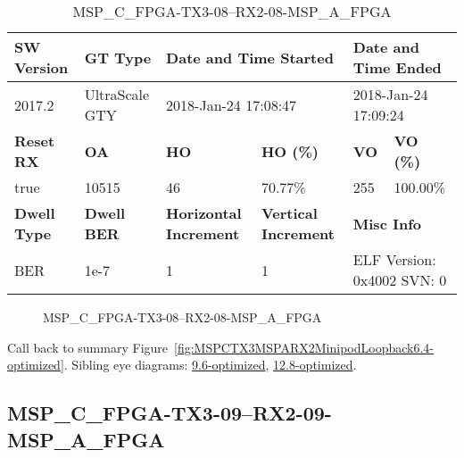 \begin{table}[h]
\centering
\caption{MSP\_C\_FPGA-TX3-08--RX2-08-MSP\_A\_FPGA}
\label{tab:MSPCFPGATX308RX208MSPAFPGA6.4-optimized}
\begin{tabular}{@{}|l|l|l|l|l|l|@{}}
\toprule
\textbf{SW Version}                & \textbf{GT Type}   & \multicolumn{2}{l|}{\textbf{Date and Time Started}}            & \multicolumn{2}{l|}{\textbf{Date and Time Ended}}        \\ \midrule
2017.2                       & UltraScale GTY          & \multicolumn{2}{l|}{2018-Jan-24 17:08:47}                   & \multicolumn{2}{l|}{2018-Jan-24 17:09:24}               \\ \midrule
\textbf{Reset RX}                  & \textbf{OA} & \textbf{HO}   & \textbf{HO (\%)} & \textbf{VO} & \textbf{VO (\%)} \\ \midrule
true & 10515        & 46          & 70.77\%        & 255        & 100.00\%       \\ \midrule
\textbf{Dwell Type}                & \textbf{Dwell BER} & \textbf{Horizontal Increment} & \textbf{Vertical Increment}    & \multicolumn{2}{l|}{\textbf{Misc Info}}                  \\ \midrule
BER                            & 1e-7        & 1        & 1           & \multicolumn{2}{l|}{ELF Version: 0x4002 SVN: 0}                         \\ \bottomrule
\end{tabular}
\end{table}

\begin{figure}[h]
\caption{MSP\_C\_FPGA-TX3-08--RX2-08-MSP\_A\_FPGA} \label{fig:MSPCFPGATX308RX208MSPAFPGA6.4-optimized}
\end{figure}

Call back to summary Figure~\ref{fig:MSPCTX3MSPARX2MinipodLoopback6.4-optimized}.
Sibling eye diagrams: \hyperref[sec:MSPCFPGATX308RX208MSPAFPGA9.6-optimized]{9.6-optimized}, \hyperref[sec:MSPCFPGATX308RX208MSPAFPGA12.8-optimized]{12.8-optimized}.

\clearpage
\newpage


\subsection{MSP\_C\_FPGA-TX3-09--RX2-09-MSP\_A\_FPGA}\label{sec:MSPCFPGATX309RX209MSPAFPGA6.4-optimized}

